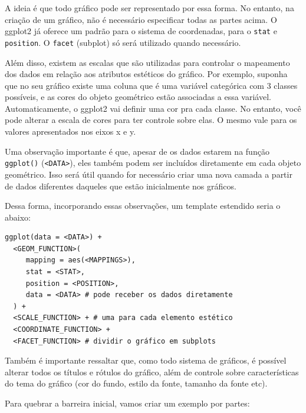 \documentclass[]{book}
\begin{document}
A ideia é que todo gráfico pode ser representado por essa forma. No
entanto, na criação de um gráfico, não é necessário especificar todas as
partes acima. O ggplot2 já oferece um padrão para o sistema de
coordenadas, para o \texttt{stat} e \texttt{position}. O \texttt{facet}
(subplot) só será utilizado quando necessário.

Além disso, existem as escalas que são utilizadas para controlar o
mapeamento dos dados em relação aos atributos estéticos do gráfico. Por
exemplo, suponha que no seu gráfico existe uma coluna que é uma variável
categórica com 3 classes possíveis, e as cores do objeto geométrico
estão associadas a essa variável. Automaticamente, o ggplot2 vai definir
uma cor pra cada classe. No entanto, você pode alterar a escala de cores
para ter controle sobre elas. O mesmo vale para os valores apresentados
nos eixos x e y.

Uma observação importante é que, apesar de os dados estarem na função
\texttt{ggplot()} (\texttt{\textless{}DATA\textgreater{}}), eles também
podem ser incluídos diretamente em cada objeto geométrico. Isso será
útil quando for necessário criar uma nova camada a partir de dados
diferentes daqueles que estão inicialmente nos gráficos.

Dessa forma, incorporando essas observações, um template estendido seria
o abaixo:

\begin{verbatim}
ggplot(data = <DATA>) + 
  <GEOM_FUNCTION>(
     mapping = aes(<MAPPINGS>),
     stat = <STAT>, 
     position = <POSITION>,
     data = <DATA> # pode receber os dados diretamente
  ) +
  <SCALE_FUNCTION> + # uma para cada elemento estético
  <COORDINATE_FUNCTION> +
  <FACET_FUNCTION> # dividir o gráfico em subplots
\end{verbatim}

Também é importante ressaltar que, como todo sistema de gráficos, é
possível alterar todos os títulos e rótulos do gráfico, além de controle
sobre características do tema do gráfico (cor do fundo, estilo da fonte,
tamanho da fonte etc).

Para quebrar a barreira inicial, vamos criar um exemplo por partes:
\end{document}
